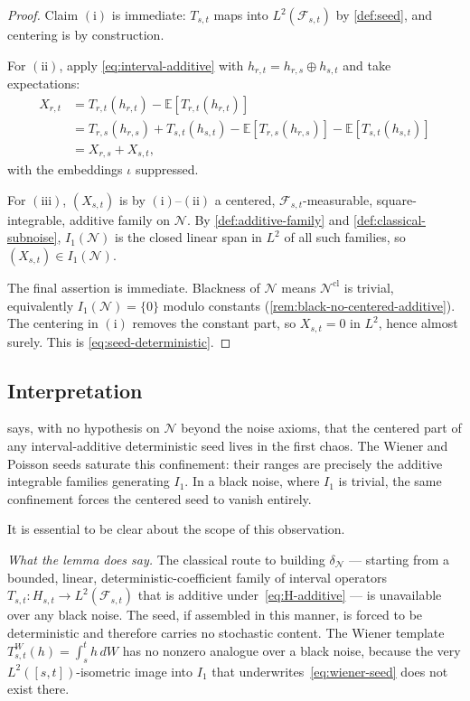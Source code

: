 \documentclass[11pt,reqno]{amsart}
\theoremstyle{plain}
\theoremstyle{definition}
\theoremstyle{remark}
\newcommand{\E}{\mathbb{E}}
\begin{document}
\begin{proof}
Claim $(\mathrm i)$ is immediate: $T_{s,t}$ maps into
$L^2(\mathcal F_{s,t})$ by \cref{def:seed}, and centering is by
construction.

For $(\mathrm{ii})$, apply \eqref{eq:interval-additive} with
$h_{r,t}=h_{r,s}\oplus h_{s,t}$ and take expectations:
\begin{align*}
  X_{r,t}
  &=T_{r,t}(h_{r,t})-\E[T_{r,t}(h_{r,t})]\\
  &=T_{r,s}(h_{r,s})+T_{s,t}(h_{s,t})
   -\E[T_{r,s}(h_{r,s})]-\E[T_{s,t}(h_{s,t})]\\
  &=X_{r,s}+X_{s,t},
\end{align*}
with the embeddings $\iota$ suppressed.

For $(\mathrm{iii})$, $(X_{s,t})$ is by $(\mathrm i)$--$(\mathrm{ii})$
a centered, $\mathcal F_{s,t}$-measurable, square-integrable, additive
family on $\mathcal N$. By \cref{def:additive-family} and
\cref{def:classical-subnoise}, $I_1(\mathcal N)$ is the closed
linear span in $L^2$ of all such families, so
$(X_{s,t})\in I_1(\mathcal N)$.

The final assertion is immediate. Blackness of $\mathcal N$ means
$\mathcal N^{\mathrm{cl}}$ is trivial, equivalently
$I_1(\mathcal N)=\{0\}$ modulo constants
(\cref{rem:black-no-centered-additive}). The centering in
$(\mathrm i)$ removes the constant part, so $X_{s,t}=0$ in $L^2$,
hence almost surely. This is \eqref{eq:seed-deterministic}.
\end{proof}

\subsection{Interpretation}\label{sec:seed-interpretation}

 says, with no hypothesis on $\mathcal N$ beyond the
noise axioms, that the centered part of any interval-additive
deterministic seed lives in the first chaos. The Wiener and Poisson
seeds saturate this confinement: their ranges are precisely the
additive integrable families generating $I_1$. In a black noise,
where $I_1$ is trivial, the same confinement forces the centered seed
to vanish entirely.

It is essential to be clear about the scope of this observation.

\medskip
\noindent\emph{What the lemma does say.}
The classical route to building $\delta_{\mathcal N}$ --- starting
from a bounded, linear, deterministic-coefficient family of interval
operators $T_{s,t}\colon H_{s,t}\to L^2(\mathcal F_{s,t})$ that is
additive under~\eqref{eq:H-additive} --- is unavailable over any
black noise. The seed, if assembled in this manner, is forced to be
deterministic and therefore carries no stochastic content. The
Wiener template $T^W_{s,t}(h)=\int_s^t h\,dW$ has no nonzero analogue
over a black noise, because the very $L^2([s,t])$-isometric image
into $I_1$ that underwrites~\eqref{eq:wiener-seed} does not exist
there.
\end{document}
